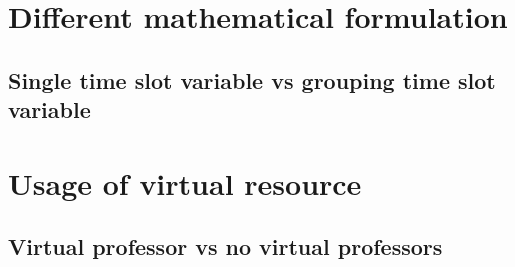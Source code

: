 \section{Different mathematical formulation}

\subsection{Single time slot variable vs grouping time slot variable}




\section{Usage of virtual resource}

\subsection{Virtual professor vs no virtual professors}

